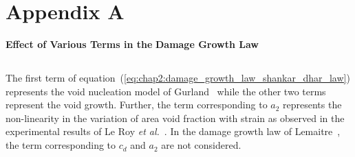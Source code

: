 \chapter*{Appendix A} \label{appendix}
{\huge{\textbf{Effect of Various Terms in the }}}
\vspace{3mm}
{\huge{\textbf{Damage Growth Law}}}
\vspace{-1cm}\section*{}
The first term of equation~(\ref{eq:chap2:damage_growth_law_shankar_dhar_law}) represents the void nucleation model of Gurland~\cite{Gurland_1972} while the other two terms represent the void growth.
Further, the term corresponding to $a_{2}$ represents the non-linearity in the
 variation of area void fraction with strain as observed in the experimental results of
 Le Roy \emph{et al.}~\cite{Leroy_1981}. In the damage growth law of Lemaitre~\cite{Lemaitre_1985},
 the term corresponding to $c_{d}$ and $a_{2}$ are not considered.

